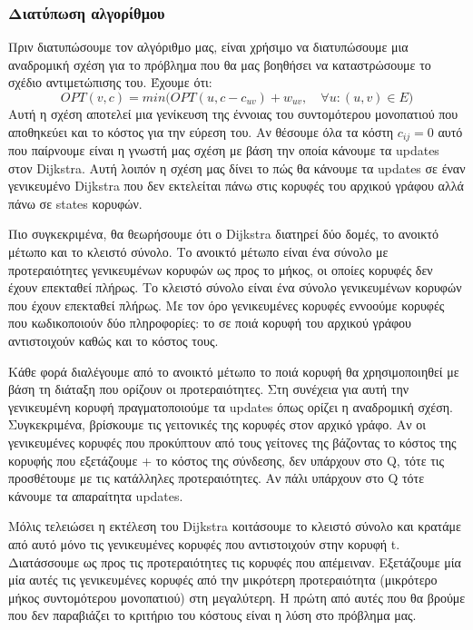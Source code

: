 \documentclass[a4paper,oneside, 11pt]{article}
\begin{document}
\subsubsection{Διατύπωση αλγορίθμου}

Πριν διατυπώσουμε τον αλγόριθμο μας, είναι χρήσιμο να διατυπώσουμε μια αναδρομική σχέση για το πρόβλημα που θα μας βοηθήσει να καταστρώσουμε το σχέδιο αντιμετώπισης του. Έχουμε ότι:
$$
OPT(v, c) = min \big( OPT(u, c-c_{uv}) + w_{uv}, \quad \forall u: (u,v) \in E \big)
$$
Αυτή η σχέση αποτελεί μια γενίκευση της έννοιας του συντομότερου μονοπατιού που αποθηκεύει και το κόστος για την εύρεση του. Αν θέσουμε όλα τα κόστη $c_{ij}=0$ αυτό που παίρνουμε είναι η γνωστή μας σχέση με βάση την οποία κάνουμε τα updates στον Dijkstra. Αυτή λοιπόν η σχέση μας δίνει το πώς θα κάνουμε τα updates σε έναν γενικευμένο Dijkstra που δεν εκτελείται πάνω στις κορυφές του αρχικού γράφου αλλά πάνω σε states κορυφών. \bigbreak

Πιο συγκεκριμένα, θα θεωρήσουμε ότι ο Dijkstra διατηρεί δύο δομές, το ανοικτό μέτωπο και το κλειστό σύνολο. Το ανοικτό μέτωπο είναι ένα σύνολο με προτεραιότητες γενικευμένων κορυφών ως προς το μήκος, οι οποίες κορυφές δεν έχουν επεκταθεί πλήρως. Το κλειστό σύνολο είναι ένα σύνολο γενικευμένων κορυφών που έχουν επεκταθεί πλήρως. Με τον όρο γενικευμένες κορυφές εννοούμε κορυφές που κωδικοποιούν δύο πληροφορίες: το σε ποιά κορυφή του αρχικού γράφου αντιστοιχούν καθώς και το κόστος τους. \bigbreak 


Κάθε φορά διαλέγουμε από το ανοικτό μέτωπο το ποιά κορυφή θα χρησιμοποιηθεί με βάση τη διάταξη που ορίζουν οι προτεραιότητες. Στη συνέχεια για αυτή την γενικευμένη κορυφή πραγματοποιούμε τα updates όπως ορίζει η αναδρομική σχέση. Συγκεκριμένα, βρίσκουμε τις γειτονικές της κορυφές στον αρχικό γράφο. Αν οι γενικευμένες κορυφές που προκύπτουν από τους γείτονες της βάζοντας το κόστος της κορυφής που εξετάζουμε + το κόστος της σύνδεσης, δεν υπάρχουν στο Q, τότε τις προσθέτουμε με τις κατάλληλες προτεραιότητες. Αν πάλι υπάρχουν στο Q τότε κάνουμε τα απαραίτητα updates. \bigbreak 

Μόλις τελειώσει η εκτέλεση του Dijkstra κοιτάσουμε το κλειστό σύνολο και κρατάμε από αυτό μόνο τις γενικευμένες κορυφές που αντιστοιχούν στην κορυφή t. Διατάσσουμε ως προς τις προτεραιότητες τις κορυφές που απέμειναν. Εξετάζουμε μία μία αυτές τις γενικευμένες κορυφές από την μικρότερη προτεραιότητα (μικρότερο μήκος συντομότερου μονοπατιού) στη μεγαλύτερη. Η πρώτη από αυτές που θα βρούμε που δεν παραβιάζει το κριτήριο του κόστους είναι η λύση στο πρόβλημα μας.
\end{document}
